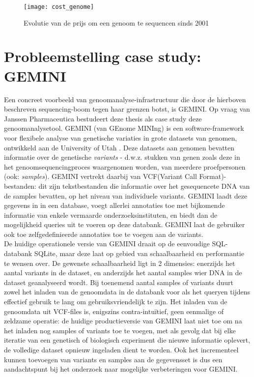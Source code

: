 \begin{figure}[h!]
\texttt{[image: cost\_genome]}
\caption{Evolutie van de prijs om een genoom te sequencen sinds 2001}
\label{sequencing_cost}
\end{figure}

\section{Probleemstelling case study: GEMINI}

Een concreet voorbeeld van genoomanalyse-infrastructuur die door de hierboven beschreven sequencing-boom tegen haar grenzen botst, is GEMINI. Op vraag van Janssen Pharmaceutica bestudeert deze thesis als case study deze genoomanalysetool. GEMINI (van GEnome MINIng) is een software-framework voor flexibele analyse van genetische variaties in grote datasets van genomen, ontwikkeld aan de University of Utah \cite{10.1371/journal.pcbi.1003153}. Deze datasets aan genomen bevatten informatie over de genetische \textit{variants} - d.w.z. stukken van genen zoals deze in het genoomsequencingproces waargenomen worden, van meerdere proefpersonen (ook: \textit{samples}). GEMINI vertrekt daarbij van VCF(Variant Call Format)-bestanden: dit zijn tekstbestanden die informatie over het gesequencete DNA van de samples bevatten, op het niveau van individuele variants. GEMINI laadt deze gegevens in in een database, voegt allerlei annotaties toe met bijkomende informatie van enkele vermaarde onderzoeksinstituten, en biedt dan de mogelijkheid queries uit te voeren op deze databank. GEMINI laat de gebruiker ook toe zelfgedefinieerde annotaties toe te voegen aan de variants. \\
De huidige operationele versie van GEMINI draait op de eenvoudige SQL-databank SQLite, maar deze laat op gebied van schaalbaarheid en performantie te wensen over. De gewenste schaalbaarheid ligt in 2 dimensies: enerzijds het aantal variants in de dataset, en anderzijds het aantal samples wier DNA in de dataset geanalyseerd wordt. Bij toenemend 
aantal samples of variants duurt zowel het inladen van de genoomdata in de databank voor als het queryen tijdens effectief gebruik te lang om gebruiksvriendelijk te zijn. Het inladen van de genoomdata uit VCF-files is, enigszins contra-intu\"itief, geen eenmalige of zeldzame operatie: de huidige productieversie van GEMINI laat niet toe om na het inladen nog samples of variants toe te voegen, met als gevolg dat bij elke iteratie van een genetisch of biologisch experiment die nieuwe informatie oplevert, de volledige dataset opnieuw ingeladen dient te worden. Ook het incrementeel kunnen toevoegen van variants en samples aan de gegevensset is dus een aandachtspunt bij het onderzoek naar mogelijke verbeteringen voor GEMINI.\\
